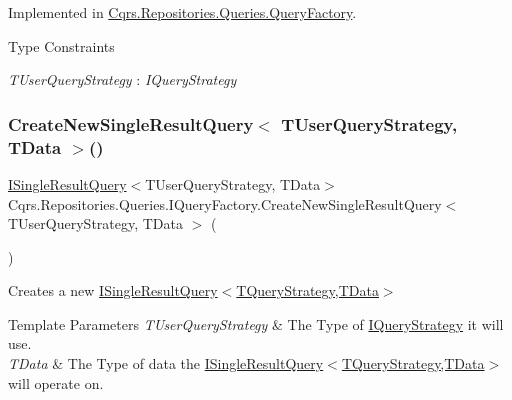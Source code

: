 Implemented in \hyperlink{classCqrs_1_1Repositories_1_1Queries_1_1QueryFactory_aaadcf9eb14390c49d668023a9e9950d7_aaadcf9eb14390c49d668023a9e9950d7}{Cqrs.\+Repositories.\+Queries.\+Query\+Factory}.

\begin{Desc}
\item[Type Constraints]\begin{description}
\item[{\em T\+User\+Query\+Strategy} : {\em I\+Query\+Strategy}]\end{description}
\end{Desc}
\mbox{\label{interfaceCqrs_1_1Repositories_1_1Queries_1_1IQueryFactory_a237aee0f99d8bfc03d8f10595f16ecea_a237aee0f99d8bfc03d8f10595f16ecea}} 
\subsubsection{\texorpdfstring{Create\+New\+Single\+Result\+Query$<$ T\+User\+Query\+Strategy, T\+Data $>$()}{CreateNewSingleResultQuery< TUserQueryStrategy, TData >()}}
{\footnotesize\ttfamily \hyperlink{interfaceCqrs_1_1Repositories_1_1Queries_1_1ISingleResultQuery}{I\+Single\+Result\+Query}$<$T\+User\+Query\+Strategy, T\+Data$>$ Cqrs.\+Repositories.\+Queries.\+I\+Query\+Factory.\+Create\+New\+Single\+Result\+Query$<$ T\+User\+Query\+Strategy, T\+Data $>$ (\begin{DoxyParamCaption}{ }\end{DoxyParamCaption})}



Creates a new \hyperlink{interfaceCqrs_1_1Repositories_1_1Queries_1_1ISingleResultQuery}{I\+Single\+Result\+Query$<$\+T\+Query\+Strategy,\+T\+Data$>$} 


\begin{DoxyTemplParams}{Template Parameters}
{\em T\+User\+Query\+Strategy} & The Type of \hyperlink{interfaceCqrs_1_1Repositories_1_1Queries_1_1IQueryStrategy}{I\+Query\+Strategy} it will use.\\
\hline
{\em T\+Data} & The Type of data the \hyperlink{interfaceCqrs_1_1Repositories_1_1Queries_1_1ISingleResultQuery}{I\+Single\+Result\+Query$<$\+T\+Query\+Strategy,\+T\+Data$>$} will operate on.\\
\hline
\end{DoxyTemplParams}


